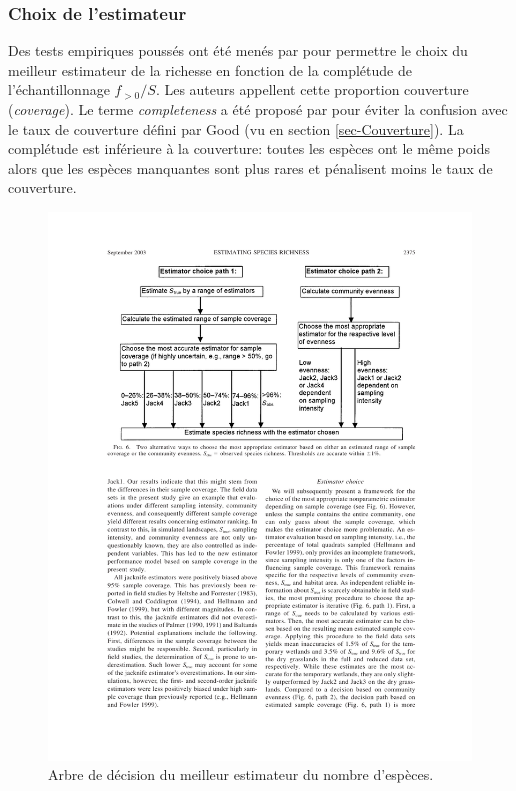 \documentclass[
  11pt,
  american,
  a4paper,
  extrafontsizes,onecolumn,openright
  ]{memoir}
\begin{document}
\normalsize

\subsubsection{Choix de l'estimateur}\label{sec-ChoixEstimateur}

Des tests empiriques poussés ont été menés par \textcite{Brose2003} pour permettre le choix du meilleur estimateur de la richesse en fonction de la complétude de l'échantillonnage \(f_{>0}/{S}\).
Les auteurs appellent cette proportion couverture (\emph{coverage}).
Le terme \emph{completeness} a été proposé par \textcite{Beck2010} pour éviter la confusion avec le taux de couverture défini par Good (vu en section \ref{sec-Couverture}).
La complétude est inférieure à la couverture: toutes les espèces ont le même poids alors que les espèces manquantes sont plus rares et pénalisent moins le taux de couverture.



\scriptsize

\begin{figure}

{\centering \includegraphics[width=0.8\linewidth]{images/Brose2003} 

}

\caption{Arbre de décision du meilleur estimateur du nombre d'espèces.}\label{fig:Brose2003}
\end{figure}
\end{document}
